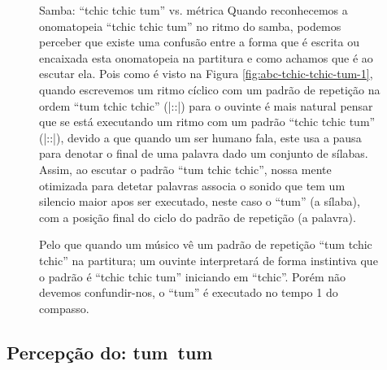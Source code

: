 \begin{figure}[!h]
\begin{elaboracion}{Samba: ``tchic tchic tum'' vs. métrica}
Quando reconhecemos a onomatopeia ``tchic tchic tum'' no ritmo do samba, 
podemos perceber que existe uma confusão entre 
a forma que é escrita ou encaixada esta onomatopeia na partitura e como achamos que é ao escutar ela.
Pois como é visto na Figura \ref{fig:abc-tchic-tchic-tum-1}, quando escrevemos
um ritmo cíclico com um padrão de repetição na ordem ``tum tchic tchic'' (|:\Vier \Acht \Acht:|) 
para o ouvinte é mais natural pensar que se está executando um ritmo com um padrão ``tchic tchic tum'' 
(|:\Acht \Acht \Vier:|), 
devido a que quando um ser humano fala, este usa a pausa
para denotar o final de uma palavra dado um conjunto de sílabas. Assim, ao escutar o padrão ``tum tchic tchic'', 
nossa mente otimizada para detetar palavras associa o sonido que tem um silencio maior apos ser executado,
neste caso o ``tum'' (a sílaba), com a posição final do ciclo do padrão de repetição (a palavra). 

Pelo que quando um músico vê um padrão de repetição ``tum tchic tchic'' na partitura; 
um ouvinte interpretará de forma instintiva que o padrão é ``tchic tchic tum'' iniciando em ``tchic''.
Porém não devemos confundir-nos, o ``tum'' é executado no tempo 1 do compasso.
\end{elaboracion}
\label{fig:RitmoVsFala}
\end{figure}

\subsection{Percepção do: tum~tum}

